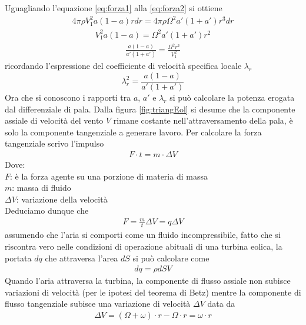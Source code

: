 Uguagliando l'equazione \ref{eq:forza1} alla \ref{eq:forza2} si ottiene
\begin{align*}
4 \pi \rho V_1^2 a \left( 1 - a \right) r dr = 4 \pi \rho \Omega^2 a' \left( 1 + a' \right) r^3 dr
\end{align*}
\begin{align*}
V_1^2 a \left( 1 - a \right) = \Omega^2 a' \left( 1 + a' \right) r^2
\end{align*}
\begin{align*}
\frac{a \left( 1 - a \right)}{a' \left(1 + a' \right)} = \frac{\Omega^2 r^2}{V_1^2}
\end{align*}
ricordando l'espressione del coefficiente di velocità specifica locale $\lambda_r$
\begin{equation}\label{eq:lambdara}
\lambda_r^2 = \frac{a \left(1 - a \right)}{a' \left( 1 + a' \right)}
\end{equation}
Ora che si conoscono i rapporti tra $a$, $a'$ e $\lambda_r$ si può calcolare la potenza erogata dal differenziale di pala. Dalla figura \ref{fig:triangEol} si desume che la componente assiale di velocità del vento $V$ rimane costante nell'attraversamento della pala, è solo la componente tangenziale a generare lavoro. Per calcolare la forza tangenziale scrivo l'impulso 
\begin{align*}
F \cdot t = m \cdot \Delta V
\end{align*}
Dove:\\[1mm]
$F$: è la forza agente su una porzione di materia di massa \\
$m$: massa di fluido\\ 
$\Delta V$: variazione della velocità\\[2mm]
Deduciamo dunque che
\begin{align*}
F = \frac{m}{t} \Delta V = q \Delta V
\end{align*}
assumendo che l'aria si comporti come un fluido incompressibile, fatto che si riscontra vero nelle condizioni di operazione abituali di una turbina eolica, la portata $dq$ che attraversa l'area $dS$ si può calcolare come 
\begin{align*}
dq = \rho dS V
\end{align*}
Quando l'aria attraversa la turbina, la componente di flusso assiale non subisce variazioni di velocità (per le ipotesi del teorema di Betz) mentre la componente di flusso tangenziale subisce una variazione di velocità $\Delta V$ data da
\begin{align*}
\Delta V = \left( \Omega + \omega \right) \cdot r - \Omega \cdot r = \omega \cdot r
\end{align*}
